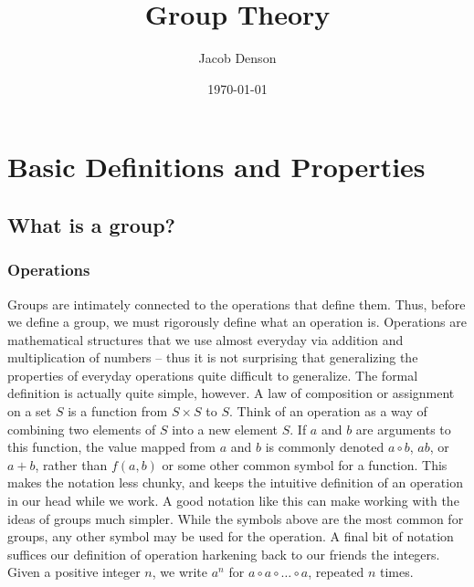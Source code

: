 \documentclass{report}
\title{Group Theory}
\author{Jacob Denson}
\date{\today}
\makeatletter
\def\printauthor{%
    {\large \@author}}
\newcommand\titlepagedecoration{%
\begin{tikzpicture}[remember picture,overlay,shorten >= -10pt]

\coordinate (aux1) at ([yshift=-15pt]current page.north east);
\coordinate (aux2) at ([yshift=-410pt]current page.north east);
\coordinate (aux3) at ([xshift=-4.5cm]current page.north east);
\coordinate (aux4) at ([yshift=-150pt]current page.north east);

\begin{scope}[titlepagecolor!40,line width=12pt,rounded corners=12pt]
\draw
  (aux1) -- coordinate (a)
  ++(225:5) --
  ++(-45:5.1) coordinate (b);
\draw[shorten <= -10pt]
  (aux3) --
  (a) --
  (aux1);
\draw[opacity=0.6,titlepagecolor,shorten <= -10pt]
  (b) --
  ++(225:2.2) --
  ++(-45:2.2);
\end{scope}
\draw[titlepagecolor,line width=8pt,rounded corners=8pt,shorten <= -10pt]
  (aux4) --
  ++(225:0.8) --
  ++(-45:0.8);
\begin{scope}[titlepagecolor!70,line width=6pt,rounded corners=8pt]
\draw[shorten <= -10pt]
  (aux2) --
  ++(225:3) coordinate[pos=0.45] (c) --
  ++(-45:3.1);
\draw
  (aux2) --
  (c) --
  ++(135:2.5) --
  ++(45:2.5) --
  ++(-45:2.5) coordinate[pos=0.3] (d);   
\draw 
  (d) -- +(45:1);
\end{scope}
\end{tikzpicture}%
}
\makeatother
\begin{document}

\chapter{Basic Definitions and Properties}

\section{What is a group?}

\subsection{Operations}

Groups are intimately connected to the operations that define them. Thus, before we define a group, we must rigorously define what an operation is. Operations are mathematical structures that we use almost everyday via addition and multiplication of numbers -- thus it is not surprising that generalizing the properties of everyday operations quite difficult to generalize. The formal definition is actually quite simple, however. A law of composition or assignment on a set $S$ is a function from $S \times S$ to $S$. Think of an operation as a way of combining two elements of $S$ into a new element $S$. If $a$ and $b$ are arguments to this function, the value mapped from $a$ and $b$ is commonly denoted $a \circ b$, $ab$, or $a + b$, rather than $f(a,b)$ or some other common symbol for a function. This makes the notation less chunky, and keeps the intuitive definition of an operation in our head while we work. A good notation like this can make working with the ideas of groups much simpler. While the symbols above are the most common for groups, any other symbol may be used for the operation. A final bit of notation suffices our definition of operation harkening back to our friends the integers. Given a positive integer $n$, we write $a^n$ for $a \circ a \circ \dots \circ a$, repeated $n$ times.
\end{document}
